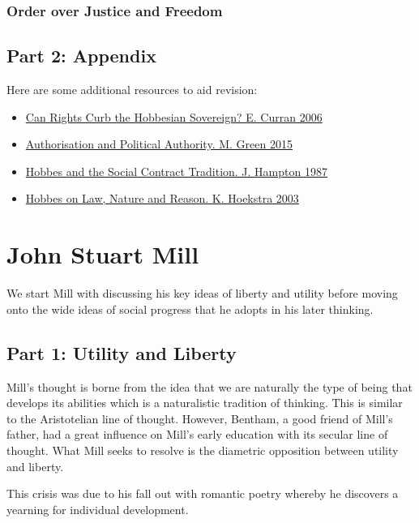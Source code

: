 \documentclass[12pt, letterpaper]{article}
\begin{document}
\subsubsection{Order over Justice and Freedom}

\subsection{Part 2: Appendix}
Here are some additional resources to aid revision:
\begin{itemize}
	\item \href{https://www.jstor.org/stable/27639430?seq=1#page_scan_tab_contents}{Can Rights Curb the Hobbesian Sovereign? E. Curran 2006}
	\item \href{http://muse.jhu.edu.gate3.library.lse.ac.uk/article/566925}{Authorisation and Political Authority. M. Green 2015}
	\item \href{https://www-cambridge-org.gate3.library.lse.ac.uk/core/books/hobbes-and-the-social-contract-tradition/269668B2323D23C3799CCC84A6A64D66}{Hobbes and the Social Contract Tradition. J. Hampton 1987}
	\item \href{http://muse.jhu.edu.gate3.library.lse.ac.uk/article/37609}{Hobbes on Law, Nature and Reason. K. Hoekstra 2003}

\end{itemize}

\newpage
\section{John Stuart Mill}
We start Mill with discussing his key ideas of liberty and utility before moving onto the wide ideas of social progress that he adopts in his later thinking.

\subsection{Part 1: Utility and Liberty}
Mill's thought is borne from the idea that we are naturally the type of being that develops its abilities which is a naturalistic tradition of thinking. This is similar to the Aristotelian line of thought. However, Bentham, a good friend of Mill's father, had a great influence on Mill's early education with its secular line of thought. What Mill seeks to resolve is the diametric opposition between utility and liberty.

This crisis was due to his fall out with romantic poetry whereby he discovers a yearning for individual development.
\end{document}
